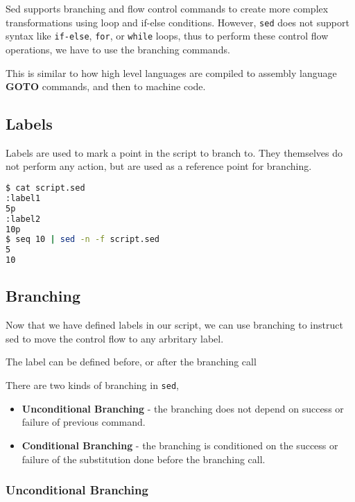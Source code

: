 Sed supports branching and flow control commands to create more complex transformations using loop and if-else conditions.
However, \lstinline|sed| does not support syntax like \lstinline|if-else|, \lstinline|for|, or \lstinline|while| loops,
thus to perform these control flow operations, we have to use the branching commands.

This is similar to how high level languages are compiled to assembly language \textbf{GOTO} commands, and then to machine code.

\subsection{Labels}

Labels are used to mark a point in the script to branch to.
They themselves do not perform any action, but are used as a reference point for branching.

\begin{lstlisting}[language=bash]
$ cat script.sed
:label1
5p
:label2
10p
$ seq 10 | sed -n -f script.sed
5
10
\end{lstlisting}

\subsection{Branching}

Now that we have defined labels in our script, we can use branching to instruct sed to move the control flow to any arbritary label.

\begin{remark}
  The label can be defined before, or after the branching call
\end{remark}

There are two kinds of branching in \lstinline|sed|,

\begin{itemize}
  \item \textbf{Unconditional Branching} - the branching does not depend on success or failure of previous command.
  \item \textbf{Conditional Branching} - the branching is conditioned on the success or failure of the substitution done before the branching call.
\end{itemize}

\subsubsection{Unconditional Branching}

